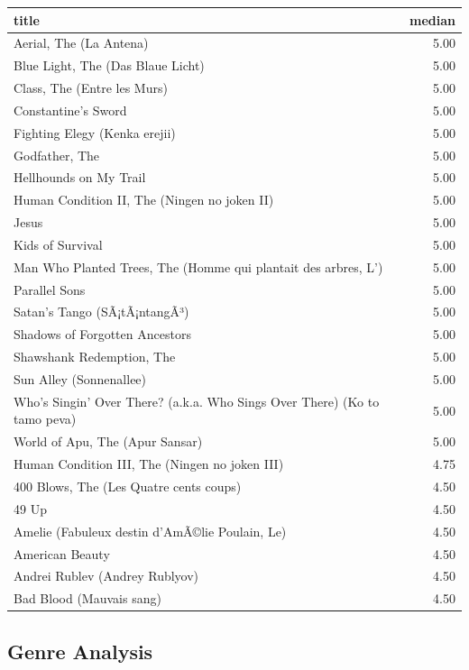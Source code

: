 \documentclass[
]{article}
\begin{document}
\begin{table}
\centering\begingroup\fontsize{10}{12}\selectfont

\begin{tabular}{l|r}
\hline
title & median\\
\hline
Aerial, The (La Antena) & 5.00\\
\hline
Blue Light, The (Das Blaue Licht) & 5.00\\
\hline
Class, The (Entre les Murs) & 5.00\\
\hline
Constantine's Sword & 5.00\\
\hline
Fighting Elegy (Kenka erejii) & 5.00\\
\hline
Godfather, The & 5.00\\
\hline
Hellhounds on My Trail & 5.00\\
\hline
Human Condition II, The (Ningen no joken II) & 5.00\\
\hline
Jesus & 5.00\\
\hline
Kids of Survival & 5.00\\
\hline
Man Who Planted Trees, The (Homme qui plantait des arbres, L') & 5.00\\
\hline
Parallel Sons & 5.00\\
\hline
Satan's Tango (SÃ¡tÃ¡ntangÃ³) & 5.00\\
\hline
Shadows of Forgotten Ancestors & 5.00\\
\hline
Shawshank Redemption, The & 5.00\\
\hline
Sun Alley (Sonnenallee) & 5.00\\
\hline
Who's Singin' Over There? (a.k.a. Who Sings Over There) (Ko to tamo peva) & 5.00\\
\hline
World of Apu, The (Apur Sansar) & 5.00\\
\hline
Human Condition III, The (Ningen no joken III) & 4.75\\
\hline
400 Blows, The (Les Quatre cents coups) & 4.50\\
\hline
49 Up & 4.50\\
\hline
Amelie (Fabuleux destin d'AmÃ©lie Poulain, Le) & 4.50\\
\hline
American Beauty & 4.50\\
\hline
Andrei Rublev (Andrey Rublyov) & 4.50\\
\hline
Bad Blood (Mauvais sang) & 4.50\\
\hline
\end{tabular}
\endgroup{}
\end{table}

\hypertarget{genre-analysis}{%
\subsection{Genre Analysis}\label{genre-analysis}}
\end{document}
